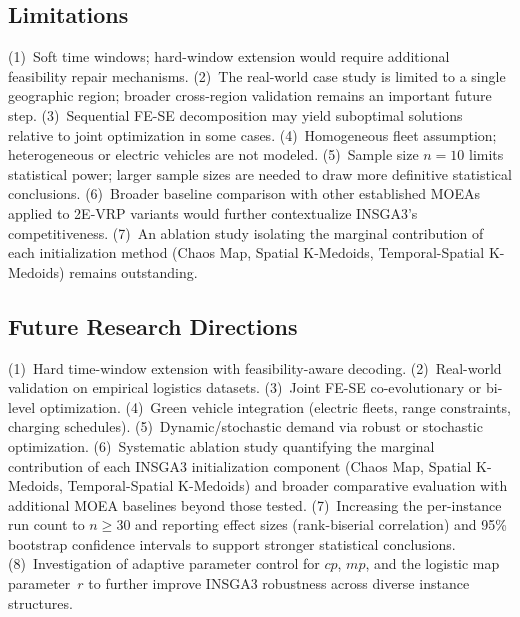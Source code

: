 \documentclass[11pt, a4paper]{article}
\numberwithin{equation}{section}
\begin{document}
\subsection{Limitations}

(1)~Soft time windows; hard-window extension would require additional
feasibility repair mechanisms.  (2)~The real-world case study is limited to a single geographic region;
broader cross-region validation remains an important future step.  (3)~Sequential FE-SE
decomposition may yield suboptimal solutions relative to joint optimization
in some cases.  (4)~Homogeneous fleet assumption; heterogeneous or electric
vehicles are not modeled.  (5)~Sample size $n=10$ limits statistical power;
larger sample sizes are needed to draw more definitive statistical conclusions.
(6)~Broader baseline comparison with other established MOEAs applied to
2E-VRP variants would further contextualize INSGA3's competitiveness.  (7)~An ablation study isolating the marginal contribution
of each initialization method (Chaos Map, Spatial K-Medoids,
Temporal-Spatial K-Medoids) remains outstanding.

\subsection{Future Research Directions}

(1)~Hard time-window extension with feasibility-aware decoding.
(2)~Real-world validation on empirical logistics datasets.
(3)~Joint FE-SE co-evolutionary or bi-level optimization.
(4)~Green vehicle integration (electric fleets, range constraints, charging
schedules).
(5)~Dynamic/stochastic demand via robust or stochastic optimization.
(6)~Systematic ablation study quantifying the marginal contribution of each
INSGA3 initialization component (Chaos Map, Spatial K-Medoids,
Temporal-Spatial K-Medoids) and broader comparative evaluation with
additional MOEA baselines beyond those tested.
(7)~Increasing the per-instance run count to $n\ge30$ and reporting effect
sizes (rank-biserial correlation) and 95\% bootstrap confidence intervals to
support stronger statistical conclusions.
(8)~Investigation of adaptive parameter control for $cp$, $mp$, and the
logistic map parameter~$r$ to further improve INSGA3 robustness across
diverse instance structures.

\printbibliography
\end{document}
